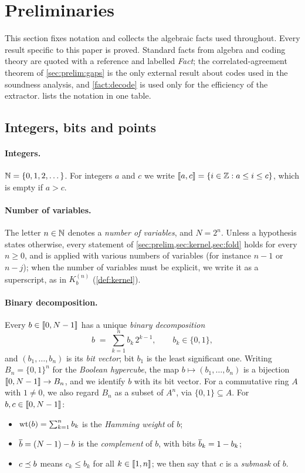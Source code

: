 \section{Preliminaries}\label{sec:prelim}

This section fixes notation and collects the algebraic facts used throughout.
Every result specific to this paper is proved.
Standard facts from algebra and coding theory are quoted with a reference and labelled \emph{Fact}; the correlated-agreement theorem of \cref{sec:prelim:gaps} is the only external result about codes used in the soundness analysis, and \cref{fact:decode} is used only for the efficiency of the extractor.
 lists the notation in one table.

\subsection{Integers, bits and points}\label{sec:prelim:bits}

\paragraph{Integers.}
$\mathbb{N} = \{0,1,2,\dots\}$.
For integers $a$ and $c$ we write $\llbracket a, c \rrbracket = \{ i \in \mathbb{Z} : a \le i \le c \}$, which is empty if $a > c$.

\paragraph{Number of variables.}
The letter $n \in \mathbb{N}$ denotes a \emph{number of variables}, and $N = 2^n$.
Unless a hypothesis states otherwise, every statement of \cref{sec:prelim,sec:kernel,sec:fold} holds for every $n \ge 0$, and is applied with various numbers of variables (for instance $n-1$ or $n-j$); when the number of variables must be explicit, we write it as a superscript, as in $K^{(n)}_b$ (\cref{def:kernel}).

\paragraph{Binary decomposition.}
Every $b \in \llbracket 0, N-1 \rrbracket$ has a unique \emph{binary decomposition}
\[
  b \;=\; \sum_{k=1}^{n} b_k\, 2^{k-1}, \qquad b_k \in \{0,1\},
\]
and $(b_1,\dots,b_n)$ is its \emph{bit vector}; bit $b_1$ is the least significant one.
Writing $B_n = \{0,1\}^n$ for the \emph{Boolean hypercube}, the map $b \mapsto (b_1,\dots,b_n)$ is a bijection $\llbracket 0, N-1 \rrbracket \to B_n$, and we identify $b$ with its bit vector.
For a commutative ring $A$ with $1 \ne 0$, we also regard $B_n$ as a subset of $A^n$, via $\{0,1\} \subseteq A$.
For $b, c \in \llbracket 0, N-1 \rrbracket$:
\begin{itemize}
  \item $\mathrm{wt}(b) = \sum_{k=1}^n b_k$ is the \emph{Hamming weight} of $b$;
  \item $\overline{b} = (N-1) - b$ is the \emph{complement} of $b$, with bits $\overline{b}_k = 1 - b_k$;
  \item $c \preceq b$ means $c_k \le b_k$ for all $k \in \llbracket 1, n \rrbracket$; we then say that $c$ is a \emph{submask} of $b$.
\end{itemize}

